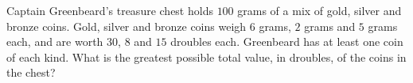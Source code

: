 Captain Greenbeard's treasure chest holds $100$ grams of a mix of gold, silver and bronze coins. Gold, silver and bronze coins weigh $6$ grams, $2$ grams and $5$ grams each, and are worth $30$, $8$ and $15$ droubles each. Greenbeard has at least one coin of each kind. What is the greatest possible total value, in droubles, of the coins in the chest?
